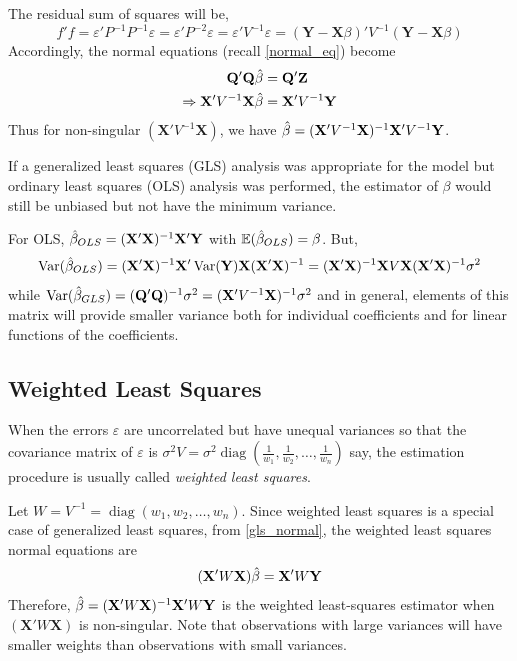 \documentclass[10pt, a4paper]{article}
\begin{document}
The residual sum of squares will be, 
\[ f'f = \varepsilon'P^{-1}P^{-1}\varepsilon = \varepsilon' P^{-2}\varepsilon = \varepsilon' V^{-1} \varepsilon = (\mathbf{Y} - \mathbf{X}\beta)' V^{-1} (\mathbf{Y} - \mathbf{X}\beta) \] 
Accordingly, the normal equations (recall \eqref{normal_eq}) become 
\begin{align}
	\mathbf{Q}'\mathbf{Q}\hat{\beta} &= \mathbf{Q}'\mathbf{Z} \notag \\
	\Rightarrow \mathbf{X}'V^{-1}\mathbf{X}\hat{\beta} &= \mathbf{X}'V^{-1}\mathbf{Y} \label{gls_normal}
\end{align}
Thus for non-singular \( (\mathbf{X'}V^{-1}\mathbf{X}) \), we have \( \hat{\beta} = (\mathbf{X}'V^{-1}\mathbf{X})^{-1}\mathbf{X}'V^{-1}\mathbf{Y} \).

\begin{remark}
If a generalized least squares (GLS) analysis was appropriate for the model but ordinary least squares (OLS) analysis was performed, the estimator of \( \beta \) would still be unbiased but not have the minimum variance.

For OLS, \( \hat{\beta}_{OLS} = (\mathbf{X}'\mathbf{X})^{-1}\mathbf{X}'\mathbf{Y} \) with \( \mathbb{E}(\hat{\beta}_{OLS}) = \beta \).
But,
\[
	\operatorname{Var}(\hat{\beta}_{OLS}) = (\mathbf{X}'\mathbf{X})^{-1}\mathbf{X}' \operatorname{Var}(\mathbf{Y}) \mathbf{X}(\mathbf{X}'\mathbf{X})^{-1}= (\mathbf{X}'\mathbf{X})^{-1}\mathbf{X}V \mathbf{X}(\mathbf{X}'\mathbf{X})^{-1} \sigma^{2}
\]
while \( \operatorname{Var}(\hat{\beta}_{GLS}) = (\mathbf{Q}'\mathbf{Q})^{-1}\sigma^{2} = (\mathbf{X}' V^{-1} \mathbf{X}) ^{-1} \sigma^{2} \)
and in general, elements of this matrix will provide smaller variance both for individual coefficients and for linear functions of the coefficients.
\end{remark}

\subsection{Weighted Least Squares}
When the errors \( \varepsilon \) are uncorrelated but have unequal variances so that the covariance matrix of \( \varepsilon \) is \( \sigma^{2}V = \sigma^{2}\operatorname{diag}(\frac{1}{w_{1}}, \frac{1}{w_{2}}, \dots, \frac{1}{w_{n}}) \) say, the estimation procedure is usually called \textit{weighted least squares}.

Let \( W = V^{-1} = \operatorname{diag}(w_{1}, w_{2}, \dots, w_{n}) \). 
Since weighted least squares is a special case of generalized least squares, from \eqref{gls_normal}, the weighted least squares normal equations are 
\begin{align}
	(\mathbf{X}'W \mathbf{X}) \hat{\beta} = \mathbf{X}'W \mathbf{Y} \label{wls_normal}
\end{align}
Therefore, \( \hat{\beta} = (\mathbf{X}'W \mathbf{X})^{-1} \mathbf{X}' W \mathbf{Y} \) is the weighted least-squares estimator when \( (\mathbf{X}'W \mathbf{X}) \) is non-singular.
Note that observations with large variances will have smaller weights than observations with small variances.
\end{document}
